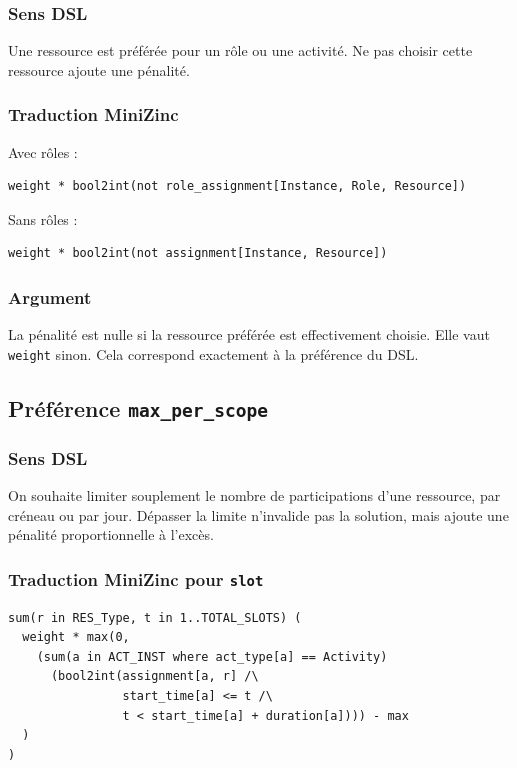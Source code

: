 \documentclass[12pt,a4paper]{article}
\begin{document}
\subsubsection*{Sens DSL}

Une ressource est préférée pour un rôle ou une activité. Ne pas choisir cette ressource ajoute une pénalité.

\subsubsection*{Traduction MiniZinc}

Avec rôles :

\begin{lstlisting}[language=MiniZinc]
weight * bool2int(not role_assignment[Instance, Role, Resource])
\end{lstlisting}

Sans rôles :

\begin{lstlisting}[language=MiniZinc]
weight * bool2int(not assignment[Instance, Resource])
\end{lstlisting}

\subsubsection*{Argument}

La pénalité est nulle si la ressource préférée est effectivement choisie. Elle vaut \texttt{weight} sinon. Cela correspond exactement à la préférence du DSL.

\subsection{Préférence \texttt{max\_per\_scope}}

\subsubsection*{Sens DSL}

On souhaite limiter souplement le nombre de participations d'une ressource, par créneau ou par jour. Dépasser la limite n'invalide pas la solution, mais ajoute une pénalité proportionnelle à l'excès.

\subsubsection*{Traduction MiniZinc pour \texttt{slot}}

\begin{lstlisting}[language=MiniZinc]
sum(r in RES_Type, t in 1..TOTAL_SLOTS) (
  weight * max(0,
    (sum(a in ACT_INST where act_type[a] == Activity)
      (bool2int(assignment[a, r] /\
                start_time[a] <= t /\
                t < start_time[a] + duration[a]))) - max
  )
)
\end{lstlisting}
\end{document}
